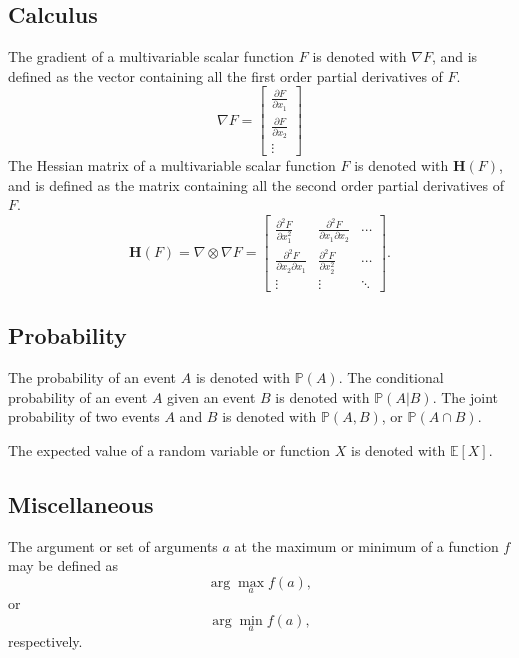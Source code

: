 \documentclass[12pt]{report}
\theoremstyle{definition}
\theoremstyle{remark}
\begin{document}
\subsection{Calculus}
The gradient of a multivariable scalar function $F$ is denoted with $\nabla F$, and is defined as the vector containing all the first order partial derivatives of $F$.
\begin{equation}
    \nabla F = \begin{bmatrix}
        \frac{\partial F}{\partial x_1} \\
        \frac{\partial F}{\partial x_2} \\
        \vdots
    \end{bmatrix}
\end{equation}
The Hessian matrix of a multivariable scalar function $F$ is denoted with $\mathbf{H}(F)$, and is defined as the matrix containing all the second order partial derivatives of $F$.
\begin{equation}
    \mathbf{H}(F) = \nabla \otimes \nabla F =
    \begin{bmatrix}
        \frac{\partial^2 F}{\partial x_1^2} & \frac{\partial^2 F}{\partial x_1 \partial x_2} & \cdots \\
        \frac{\partial^2 F}{\partial x_2 \partial x_1} & \frac{\partial^2 F}{\partial x_2^2} & \cdots \\
        \vdots & \vdots & \ddots
    \end{bmatrix}.
\end{equation}

\subsection{Probability}
The probability of an event $A$ is denoted with $\mathbb{P}(A)$. The conditional probability of an event $A$ given an event $B$ is denoted with $\mathbb{P}(A|B)$. The joint probability of two events $A$ and $B$ is denoted with $\mathbb{P}(A,B)$, or $\mathbb{P}(A \cap B)$.

The expected value of a random variable or function $X$ is denoted with $\mathbb{E}[X]$.

\subsection{Miscellaneous}
The argument or set of arguments $a$ at the maximum or minimum of a function $f$ may be defined as
\begin{equation}
    \arg\max_a f(a),
\end{equation}
or
\begin{equation}
    \arg\min_a f(a),
\end{equation}
respectively.
\end{document}
